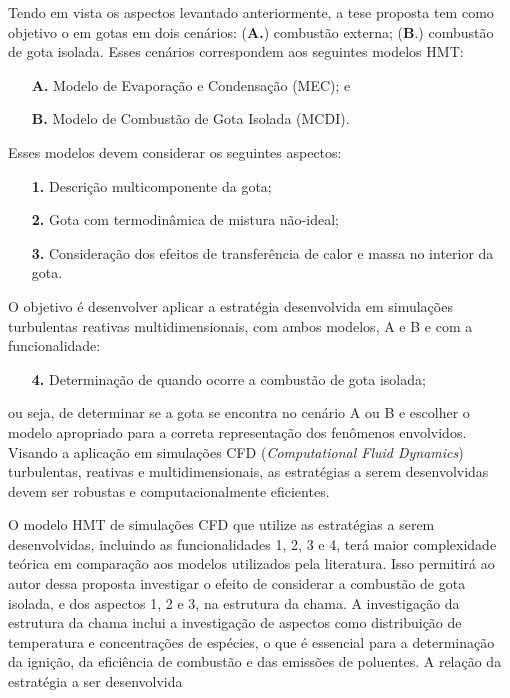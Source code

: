 Tendo em vista os aspectos levantado anteriormente, a tese proposta tem como objetivo o  em gotas em dois cenários: (\textbf{A.}) combustão externa; (\textbf{B}.) combustão de gota isolada.
Esses cenários correspondem aos seguintes modelos HMT:
\begin{enumerate}
    \item[\textbf{A.}] Modelo de Evaporação e Condensação (MEC); e 
    \item[\textbf{B.}] Modelo de Combustão de Gota Isolada (MCDI).
\end{enumerate}
Esses modelos devem considerar os seguintes aspectos: 
\begin{enumerate}
    \item[\textbf{1.}] Descrição multicomponente da gota; 
    \item[\textbf{2.}] Gota com termodinâmica de mistura não-ideal; 
    \item[\textbf{3.}] Consideração dos efeitos de transferência	de calor e massa no interior da gota. 
\end{enumerate}
O objetivo é desenvolver aplicar a estratégia desenvolvida em simulações turbulentas reativas multidimensionais, com ambos modelos, {A} e {B} e com a funcionalidade:
\begin{enumerate}
    \item[\textbf{4.}] Determinação de quando ocorre a combustão de gota isolada;
\end{enumerate}
ou seja, de determinar se a gota se encontra no cenário {A} ou {B} e escolher o modelo apropriado para a correta representação dos fenômenos envolvidos.
Visando a aplicação em simulações CFD (\emph{Computational Fluid Dynamics}) turbulentas, reativas e multidimensionais, as estratégias a serem desenvolvidas devem ser robustas e computacionalmente eficientes.

O modelo HMT de simulações CFD que utilize as estratégias a serem desenvolvidas, incluindo as funcionalidades {1}, {2}, {3} e {4}, terá maior complexidade teórica em comparação aos modelos utilizados pela literatura. 
Isso permitirá ao autor dessa proposta investigar o efeito de considerar a combustão de gota isolada, e dos aspectos {1}, {2} e {3}, na estrutura da chama.
A investigação da estrutura da chama inclui a investigação de aspectos como distribuição de temperatura e concentrações de espécies, o que é essencial para a determinação da ignição, da eficiência de combustão e das emissões de poluentes.
A relação da estratégia a ser desenvolvida %


